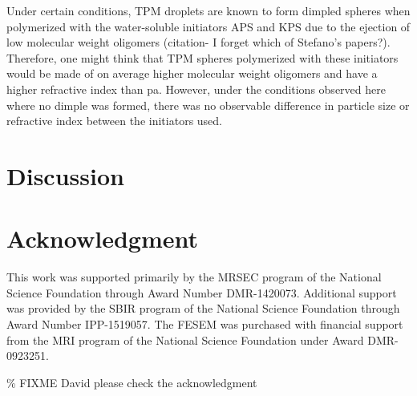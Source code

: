Under certain conditions, TPM droplets are known to form dimpled spheres when polymerized with
the water-soluble initiators APS and KPS due to the ejection of low molecular weight oligomers
(citation- I forget which of Stefano's papers?). Therefore, one might think that TPM spheres
polymerized with these initiators would be made of on average higher molecular weight oligomers
and have a higher refractive index than pa. However, under the conditions observed here where no
dimple was formed, there was no observable difference in particle size or refractive index between
the initiators used.

\section{Discussion}

\section{Acknowledgment}

This work was supported primarily by the MRSEC program of
the National Science Foundation through Award Number DMR-1420073.
Additional support was provided by the SBIR program of the
National Science Foundation through Award Number IPP-1519057.
The FESEM was purchased with financial support from the MRI program
of the National Science Foundation under Award DMR-0923251.

\% FIXME David please check the acknowledgment

